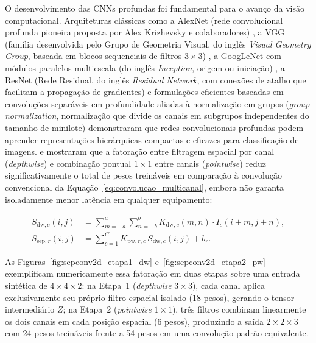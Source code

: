 \documentclass[
    12pt,
    openright,
    oneside,
    a4paper,
    english,
    brazil
]{abntex2}
\begin{document}
O desenvolvimento das CNNs profundas foi fundamental para o avanço da visão computacional. Arquiteturas clássicas como a AlexNet (rede convolucional profunda pioneira proposta por Alex Krizhevsky e colaboradores) \cite{krizhevsky2012alexnet}, a VGG (família desenvolvida pelo Grupo de Geometria Visual, do inglês \textit{Visual Geometry Group}, baseada em blocos sequenciais de filtros \(3 \times 3\)) \cite{simonyan2015vgg}, a GoogLeNet com módulos paralelos multiescala (do inglês \textit{Inception}, origem ou iniciação) \cite{szegedy2014going}, a ResNet (Rede Residual, do inglês \textit{Residual Network}, com conexões de atalho que facilitam a propagação de gradientes) \cite{he2016resnet} e formulações eficientes baseadas em convoluções separáveis em profundidade \cite{chollet2017xception} aliadas à normalização em grupos (\textit{group normalization}, normalização que divide os canais em subgrupos independentes do tamanho de minilote) \cite{wu2018groupnorm} demonstraram que redes convolucionais profundas podem aprender representações hierárquicas compactas e eficazes para classificação de imagens.  e  mostraram que a fatoração entre filtragem espacial por canal (\textit{depthwise}) e combinação pontual \(1 \times 1\) entre canais (\textit{pointwise}) reduz significativamente o total de pesos treináveis em comparação à convolução convencional da Equação~\eqref{eq:convolucao_multicanal}, embora não garanta isoladamente menor latência em qualquer equipamento:

\begin{equation}
\label{eq:conv_separavel}
\begin{aligned}
S_{\text{dw},c}(i,j) &= \sum_{m=-a}^{a}\sum_{n=-b}^{b} K_{\text{dw},c}(m,n)\cdot I_c(i+m,j+n), \\
S_{\text{sep},r}(i,j) &= \sum_{c=1}^{C} K_{\text{pw},r,c}\, S_{\text{dw},c}(i,j) + b_r.
\end{aligned}
\end{equation}

As Figuras~\ref{fig:sepconv2d_etapa1_dw} e~\ref{fig:sepconv2d_etapa2_pw} exemplificam numericamente essa fatoração em duas etapas sobre uma entrada sintética de \(4 \times 4 \times 2\): na Etapa~1 (\textit{depthwise} \(3 \times 3\)), cada canal aplica exclusivamente seu próprio filtro espacial isolado (18 pesos), gerando o tensor intermediário \(Z\); na Etapa~2 (\textit{pointwise} \(1 \times 1\)), três filtros combinam linearmente os dois canais em cada posição espacial (6 pesos), produzindo a saída \(2 \times 2 \times 3\) com 24 pesos treináveis frente a 54 pesos em uma convolução padrão equivalente.
\end{document}
